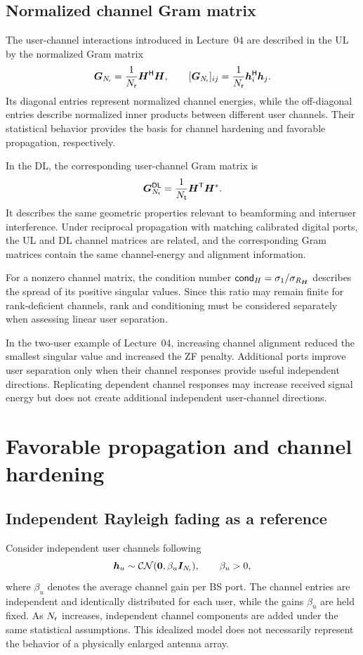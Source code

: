\subsection{Normalized channel Gram matrix}
The user-channel interactions introduced in Lecture~04 are described in the UL by the normalized Gram matrix
\begin{equation}
	\bm{G}_{N_{\mathsf{r}}}=\frac{1}{N_{\mathsf{r}}}{\bm{H}}^{\mathsf{H}}\bm{H},
	\qquad
	[\bm{G}_{N_{\mathsf{r}}}]_{ij}
	=\frac{1}{N_{\mathsf{r}}}{\bm{h}}^{\mathsf{H}}_i\bm{h}_j.
	\label{eq:gram-05}
\end{equation}
Its diagonal entries represent normalized channel energies, while the off-diagonal entries describe normalized inner products between different user channels. Their statistical behavior provides the basis for channel hardening and favorable propagation, respectively.

In the DL, the corresponding user-channel Gram matrix is
\begin{equation*}
	\bm{G}_{N_{\mathsf{t}}}^{\mathsf{DL}}
	=\frac{1}{N_{\mathsf{t}}}{\bm{H}}^{\mathsf{T}}\bm{H}^*.
\end{equation*}
It describes the same geometric properties relevant to beamforming and interuser interference. Under reciprocal propagation with matching calibrated digital ports, the UL and DL channel matrices are related, and the corresponding Gram matrices contain the same channel-energy and alignment information.

For a nonzero channel matrix, the condition number $\mathsf{cond}_H=\sigma_1/\sigma_{R_{\bm{H}}}$ describes the spread of its positive singular values. Since this ratio may remain finite for rank-deficient channels, rank and conditioning must be considered separately when assessing linear user separation.

In the two-user example of Lecture~04, increasing channel alignment reduced the smallest singular value and increased the ZF penalty. Additional ports improve user separation only when their channel responses provide useful independent directions. Replicating dependent channel responses may increase received signal energy but does not create additional independent user-channel directions.


\section{Favorable propagation and channel hardening}
\label{sec:statistics-05}

\subsection{Independent Rayleigh fading as a reference}
Consider independent user channels following
\begin{equation}
	\bm{h}_u\sim\mathcal{CN}(\bm{0},\beta_u\bm{I}_{N_{\mathsf{r}}}),
	\qquad \beta_u>0,
	\label{eq:rayleigh-05}
\end{equation}
where $\beta_u$ denotes the average channel gain per BS port. The channel entries are independent and identically distributed for each user, while the gains $\beta_u$ are held fixed. As $N_{\mathsf{r}}$ increases, independent channel components are added under the same statistical assumptions. This idealized model does not necessarily represent the behavior of a physically enlarged antenna array.

